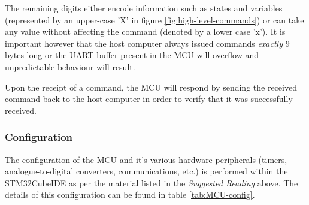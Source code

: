 The remaining digits either encode information such as states and variables (represented by an upper-case 'X' in figure \ref{fig:high-level-commands}) or can take any value without affecting the command (denoted by a lower case 'x'). It is important however that the host computer always issued commands \textit{exactly} 9 bytes long or the UART buffer present in the MCU will overflow and unpredictable behaviour will result.

Upon the receipt of a command, the MCU will respond by sending the received command back to the host computer in order to verify that it was successfully received.



\subsubsection{Configuration}

The configuration of the MCU and it's various hardware peripherals (timers, analogue-to-digital converters, communications, etc.) is performed within the STM32CubeIDE as per the material listed in the \textit{Suggested Reading} above. The details of this configuration can be found in table \ref{tab:MCU-config}.


